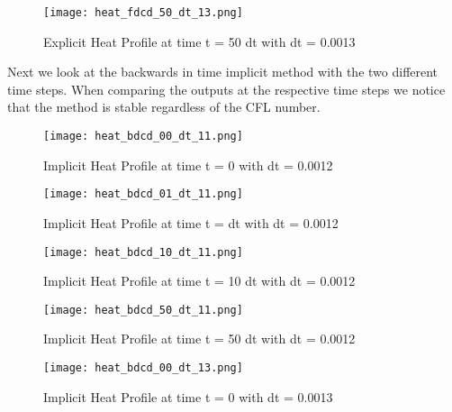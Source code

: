 \documentclass[a4paper,12pt,titlepage]{article}
\newcommand{\scale}{0.5}
\begin{document}
\begin{figure}[H]
  \begin{center}
    \texttt{[image: heat\_fdcd\_50\_dt\_13.png]}
    \caption{Explicit Heat Profile at time t = 50 dt with dt = 0.0013}
  \end{center}
\end{figure}


Next we look at the backwards in time implicit method with the two different time steps.  When comparing the outputs at the respective time steps we notice that the method is stable regardless of the CFL number.

\begin{figure}[H]
  \begin{center}
    \texttt{[image: heat\_bdcd\_00\_dt\_11.png]}
    \caption{Implicit Heat Profile at time t = 0 with dt = 0.0012}
  \end{center}
\end{figure}

\begin{figure}[H]
  \begin{center}
    \texttt{[image: heat\_bdcd\_01\_dt\_11.png]}
    \caption{Implicit Heat Profile at time t = dt with dt = 0.0012}
  \end{center}
\end{figure}

\begin{figure}[H]
  \begin{center}
    \texttt{[image: heat\_bdcd\_10\_dt\_11.png]}
    \caption{Implicit Heat Profile at time t = 10 dt with dt = 0.0012}
  \end{center}
\end{figure}

\begin{figure}[H]
  \begin{center}
    \texttt{[image: heat\_bdcd\_50\_dt\_11.png]}
    \caption{Implicit Heat Profile at time t = 50 dt with dt = 0.0012}
  \end{center}
\end{figure}

\begin{figure}[H]
  \begin{center}
    \texttt{[image: heat\_bdcd\_00\_dt\_13.png]}
    \caption{Implicit Heat Profile at time t = 0 with dt = 0.0013}
  \end{center}
\end{figure}
\end{document}
